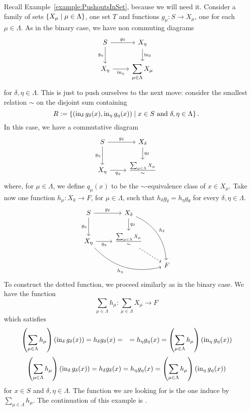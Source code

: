 \begin{example}
  Recall Example~\ref{example:PushoutsInSet}, because we will need
  it. Consider a family of sets \(\left\{X_\mu \mid \mu \in \Lambda\right\}\), one set
  \(T\) and functions \(g_\mu : S \to X_\mu\), one for each
  \(\mu \in \Lambda\). As in the binary case, we have non commuting diagrams
  \[\begin{tikzcd}
      S \ar["{g_\delta}", r] \ar["{g_\eta}", d, swap] & X_\eta \ar["{\inj_\delta}", d] \\
      X_\eta \ar["{\inj_\eta}", r, swap] & {\displaystyle\sum_{\mu \in \Lambda} X_\mu}
    \end{tikzcd}\] for \(\delta, \eta \in \Lambda\). This is just to push ourselves to
  the next move: consider the smallest relation \(\sim\) on the disjoint
  sum containing
  \[R := \left\{(\operatorname{in}_\delta g_\delta (x), \operatorname{in}_\eta g_\eta(x)) \mid x \in S \text{ and } \delta,
      \eta \in \Lambda\right\} .\] In this case, we have a commutative diagram
  \[\begin{tikzcd}
      S \ar["{g_\delta}", r] \ar["{g_\eta}", d, swap] & X_\delta \ar["{q_\delta}", d] \\
      X_\eta \ar["{q_\eta}", r, swap] & \frac{\sum_{\mu \in \Lambda} X_\mu}{\sim}
    \end{tikzcd}\] where, for \(\mu \in \Lambda\), we define
  \(q_\mu (x)\) to be the \(\sim\)-equivalence class of
  \(x \in X_\mu\). Take now one function \(h_\mu : X_k \to F\), for
  \(\mu \in \Lambda\), such that \(h_\delta g_\delta = h_\eta g_\theta\) for every \(\delta, \eta \in \Lambda\).
  \[\begin{tikzcd}
      S \ar["{g_\delta}", r] \ar["{g_\eta}", d, swap] & X_\delta \ar["{q_\delta}", d] \ar["{h_\delta}", ddr, bend left] \\
      X_\eta \ar["{q_\eta}", r, swap] \ar["{h_\eta}", drr, bend right, swap] & \frac{\sum_{\mu \in \Lambda} X_\mu}{\sim} \ar[dr, dashed] \\
      & & F
    \end{tikzcd}\] To construct the dotted function, we proceed
  similarly as in the binary case. We have the function
  \[\sum_{\mu \in \Lambda} h_\mu : \sum_{\mu \in \Lambda} X_\mu \to F\]
  which satisfies
  \begin{align*}
    & \left( \sum_{\mu \in \Lambda} h_\mu \right) (\inj_\delta g_\delta (x)) = h_\delta g_\delta (x) =  %
    & = h_\eta g_\eta (x) = \left( \sum_{\mu \in \Lambda} h_\mu \right) (\inj_\eta g_\eta (x))
  \end{align*}
  \[\left( \sum_{\mu \in \Lambda} h_\mu \right) (\operatorname{in}_\delta g_\delta (x)) = h_\delta g_\delta (x) = h_\eta
    g_\eta (x) = \left( \sum_{\mu \in \Lambda} h_\mu \right) (\operatorname{in}_\eta g_\eta (x))\] for
  \(x \in S\) and \(\delta, \eta \in \Lambda\). The function we are looking for is the
  one induce by \(\sum_{\mu \in \Lambda} h_\mu\). The continuation of this example is
  .
\end{example}

